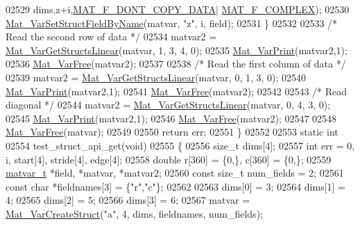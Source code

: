 \begin{DoxyCode}
{{{{{{{{02529                               dims,z+i,\hyperlink{group___m_a_t_ggab9d6ef9e3ddca78a317b173f01d53fbba762244499f52eb35e7b53fb79a1f2889}{MAT\_F\_DONT\_COPY\_DATA}|
      \hyperlink{group___m_a_t_ggab9d6ef9e3ddca78a317b173f01d53fbbacd7b091a11184aad7fc6078c04470780}{MAT\_F\_COMPLEX});
02530         \hyperlink{group___m_a_t_ga702f2b853c605c94a8af50555fc7183b}{Mat\_VarSetStructFieldByName}(matvar, \textcolor{stringliteral}{"z"}, i, field);
02531     \}
02532 
02533     \textcolor{comment}{/* Read the second row of data */}
02534     matvar2 = \hyperlink{group___m_a_t_gaa56680fb7b2cd3d410f659e945da8141}{Mat\_VarGetStructsLinear}(matvar, 1, 3, 4, 0);
02535     \hyperlink{group___m_a_t_ga9100c145e338b84b55d5d0795d5d390a}{Mat\_VarPrint}(matvar2,1);
02536     \hyperlink{group___m_a_t_ga1d14716f7450530fd1c9d02413787f0e}{Mat\_VarFree}(matvar2);
02537 
02538     \textcolor{comment}{/* Read the first column of data */}
02539     matvar2 = \hyperlink{group___m_a_t_gaa56680fb7b2cd3d410f659e945da8141}{Mat\_VarGetStructsLinear}(matvar, 0, 1, 3, 0);
02540     \hyperlink{group___m_a_t_ga9100c145e338b84b55d5d0795d5d390a}{Mat\_VarPrint}(matvar2,1);
02541     \hyperlink{group___m_a_t_ga1d14716f7450530fd1c9d02413787f0e}{Mat\_VarFree}(matvar2);
02542 
02543     \textcolor{comment}{/* Read diagonal */}
02544     matvar2 = \hyperlink{group___m_a_t_gaa56680fb7b2cd3d410f659e945da8141}{Mat\_VarGetStructsLinear}(matvar, 0, 4, 3, 0);
02545     \hyperlink{group___m_a_t_ga9100c145e338b84b55d5d0795d5d390a}{Mat\_VarPrint}(matvar2,1);
02546     \hyperlink{group___m_a_t_ga1d14716f7450530fd1c9d02413787f0e}{Mat\_VarFree}(matvar2);
02547 
02548     \hyperlink{group___m_a_t_ga1d14716f7450530fd1c9d02413787f0e}{Mat\_VarFree}(matvar);
02549 
02550     \textcolor{keywordflow}{return} err;
02551 \}
02552 
02553 \textcolor{keyword}{static} \textcolor{keywordtype}{int}
02554 test\_struct\_api\_get(\textcolor{keywordtype}{void})
02555 \{
02556     \textcolor{keywordtype}{size\_t} dims[4];
02557     \textcolor{keywordtype}{int}    err = 0, i, start[4], stride[4], edge[4];
02558     \textcolor{keywordtype}{double}    r[360] = \{0,\}, c[360] = \{0,\};
02559     \hyperlink{group___m_a_t_structmatvar__t}{matvar\_t} *field, *matvar, *matvar2;
02560     \textcolor{keyword}{const} \textcolor{keywordtype}{size\_t} num\_fields = 2;
02561     \textcolor{keyword}{const} \textcolor{keywordtype}{char} *fieldnames[3] = \{\textcolor{stringliteral}{"r"},\textcolor{stringliteral}{"c"}\};
02562 
02563     dims[0] = 3;
02564     dims[1] = 4;
02565     dims[2] = 5;
02566     dims[3] = 6;
02567     matvar = \hyperlink{group___m_a_t_gacecdb682a50977e54ecbdc54ed5c31bf}{Mat\_VarCreateStruct}(\textcolor{stringliteral}{"a"}, 4, dims, fieldnames, num\_fields);
}}}}}}}}
\end{DoxyCode}
